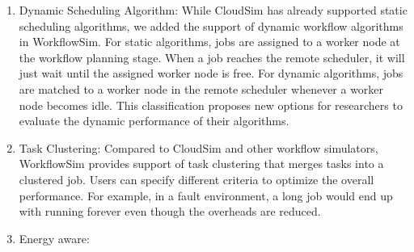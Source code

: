 \begin{enumerate}
\item{Dynamic Scheduling Algorithm}: While CloudSim has already supported static scheduling algorithms, we added the support of dynamic workflow algorithms in WorkflowSim. For static algorithms, jobs are assigned to a worker node at the workflow planning stage. When a job reaches the remote scheduler, it will just wait until the assigned worker node is free. For dynamic algorithms, jobs are matched to a worker node in the remote scheduler whenever a worker node becomes idle. This classification proposes new options for researchers to evaluate the dynamic performance of their algorithms. 

\item{Task Clustering}: Compared to CloudSim and other workflow simulators, WorkflowSim provides support of task clustering that merges tasks into a clustered job. Users can specify different criteria to optimize the overall performance. For example, in a fault environment, a long job would end up with running forever even though the overheads are reduced. 

\item{Energy aware}:

\end{enumerate}



